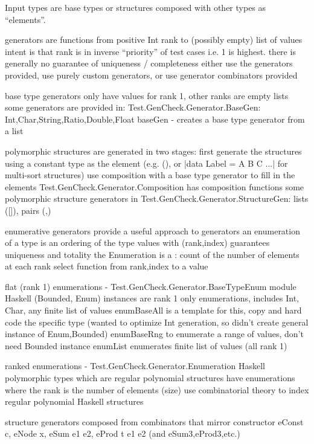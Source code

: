 Input types are base types or structures composed with other types as ``elements''.

generators are functions from positive Int rank to (possibly empty) list of values
  intent is that rank is in inverse ``priority'' of test cases i.e. 1 is highest.
  there is generally no guarantee of uniqueness / completeness
  either use the generators provided, use purely custom generators,
     or use generator combinators provided

  base type generators only have values for rank 1, other ranks are empty lists
  some generators are provided in:
    Test.GenCheck.Generator.BaseGen:
       Int,Char,String,Ratio,Double,Float
       baseGen - creates a base type generator from a list

  polymorphic structures are generated in two stages:
    first generate the structures using a constant type as the element
        (e.g. (), or |data Label = A \vbar B \vbar C ...| for multi-sort structures)
    use composition with a base type generator to fill in the elements
      Test.GenCheck.Generator.Composition has composition functions
    some polymorphic structure generators in Test.GenCheck.Generator.StructureGen:
        lists ([]), pairs (,)

enumerative generators provide a useful approach to generators
an enumeration of a type is an ordering of the type values with (rank,index)
   guarantees uniqueness and totality
the Enumeration is a : count of the number of elements at each rank
                       select function from rank,index to a value

flat (rank 1) enumerations - Test.GenCheck.Generator.BaseTypeEnum module
Haskell (Bounded, Enum) instances are rank 1 only enumerations, 
 includes Int, Char, any finite list of values
 enumBaseAll is a template for this, copy and hard code the specific type
    (wanted to optimize Int generation, so didn't create general instance of Enum,Bounded)
 enumBaseRng to enumerate a range of values, don't need Bounded instance
 enumList enumerates finite list of values (all rank 1)

ranked enumerations -   Test.GenCheck.Generator.Enumeration
Haskell polymorphic types which are regular polynomial structures 
  have enumerations where the rank is the number of elements (size)
  use combinatorial theory to index regular polynomial Haskell structures

structure generators composed from combinators that mirror constructor
eConst c, eNode x, eSum e1 e2, eProd t e1 e2 (and eSum3,eProd3,etc.)

